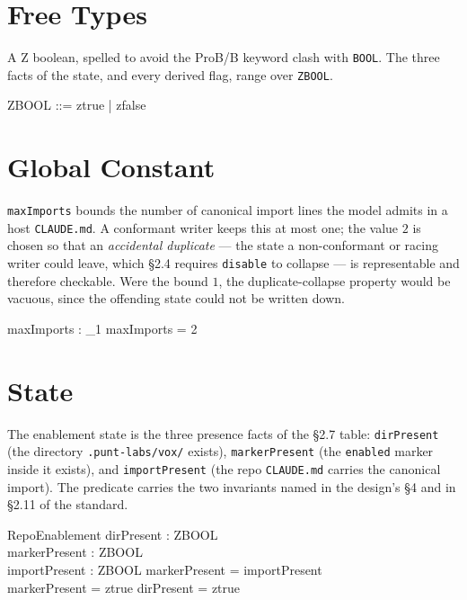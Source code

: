 \documentclass[a4paper,10pt,fleqn]{article}
\begin{document}
\section{Free Types}

A Z boolean, spelled to avoid the ProB/B keyword clash with \texttt{BOOL}. The
three facts of the state, and every derived flag, range over \texttt{ZBOOL}.

\begin{zed}
  ZBOOL ::= ztrue | zfalse
\end{zed}

\section{Global Constant}

\texttt{maxImports} bounds the number of canonical import lines the model
admits in a host \texttt{CLAUDE.md}. A conformant writer keeps this at most one;
the value $2$ is chosen so that an \emph{accidental duplicate} --- the state a
non-conformant or racing writer could leave, which \S2.4 requires
\texttt{disable} to collapse --- is representable and therefore checkable. Were
the bound $1$, the duplicate-collapse property would be vacuous, since the
offending state could not be written down.

\begin{axdef}
  maxImports : \nat_1
  \where
  maxImports = 2
\end{axdef}

\section{State}
\label{sec:state}

The enablement state is the three presence facts of the \S2.7 table:
\texttt{dirPresent} (the directory \texttt{.punt-labs/vox/} exists),
\texttt{markerPresent} (the \texttt{enabled} marker inside it exists), and
\texttt{importPresent} (the repo \texttt{CLAUDE.md} carries the canonical
import). The predicate carries the two invariants named in the design's \S4 and
in \S2.11 of the standard.

\begin{schema}{RepoEnablement}
  dirPresent : ZBOOL \\
  markerPresent : ZBOOL \\
  importPresent : ZBOOL
  \where
  markerPresent = importPresent \\
  markerPresent = ztrue \implies dirPresent = ztrue
\end{schema}
\end{document}
